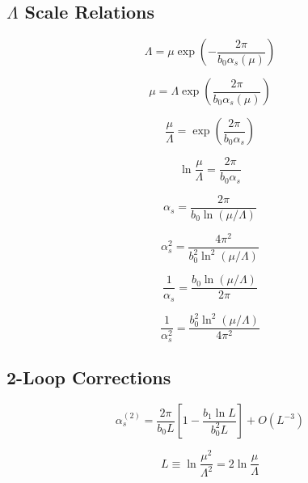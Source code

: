 \documentclass[11pt,a4paper]{article}
\theoremstyle{definition}
\begin{document}
\subsection{$\Lambda$ Scale Relations}
\label{subsec:add-lambda}

\begin{equation}
\label{eq:add-9}
\Lambda = \mu\exp\left(-\frac{2\pi}{b_0\alpha_s(\mu)}\right)
\end{equation}

\begin{equation}
\label{eq:add-10}
\mu = \Lambda\exp\left(\frac{2\pi}{b_0\alpha_s(\mu)}\right)
\end{equation}

\begin{equation}
\label{eq:add-11}
\frac{\mu}{\Lambda} = \exp\left(\frac{2\pi}{b_0\alpha_s}\right)
\end{equation}

\begin{equation}
\label{eq:add-12}
\ln\frac{\mu}{\Lambda} = \frac{2\pi}{b_0\alpha_s}
\end{equation}

\begin{equation}
\label{eq:add-13}
\alpha_s = \frac{2\pi}{b_0\ln(\mu/\Lambda)}
\end{equation}

\begin{equation}
\label{eq:add-14}
\alpha_s^2 = \frac{4\pi^2}{b_0^2\ln^2(\mu/\Lambda)}
\end{equation}

\begin{equation}
\label{eq:add-15}
\frac{1}{\alpha_s} = \frac{b_0\ln(\mu/\Lambda)}{2\pi}
\end{equation}

\begin{equation}
\label{eq:add-16}
\frac{1}{\alpha_s^2} = \frac{b_0^2\ln^2(\mu/\Lambda)}{4\pi^2}
\end{equation}

\subsection{2-Loop Corrections}
\label{subsec:add-2loop}

\begin{equation}
\label{eq:add-17}
\alpha_s^{(2)} = \frac{2\pi}{b_0 L}\left[1 - \frac{b_1\ln L}{b_0^2 L}\right] + O(L^{-3})
\end{equation}

\begin{equation}
\label{eq:add-18}
L \equiv \ln\frac{\mu^2}{\Lambda^2} = 2\ln\frac{\mu}{\Lambda}
\end{equation}
\end{document}
